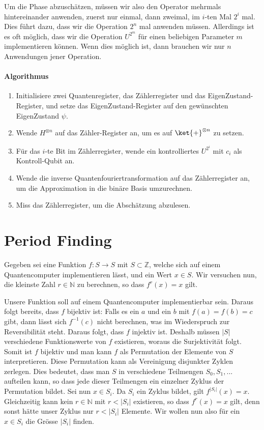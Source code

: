 Um die Phase abzuschätzen, müssen wir also den Operator mehrmals hintereinander anwenden, zuerst nur einmal, dann zweimal, im $i$-ten Mal $2^i$ mal. Dies führt dazu, dass wir die Operation $2^n$ mal anwenden müssen. Allerdings ist es oft möglich, dass wir die Operation $U^{2^m}$ für einen beliebigen Parameter $m$ implementieren können. Wenn dies möglich ist, dann brauchen wir nur $n$ Anwendungen jener Operation.

\paragraph{Algorithmus}
\begin{enumerate}
    \item Initialisiere zwei Quantenregister, das Zählerregister und das EigenZustand-Register, und setze das EigenZustand-Register auf den gewünschten EigenZustand $\psi$.
    \item Wende $H^{\otimes n}$ auf das Zähler-Register an, um es auf $\ket{+}^{\otimes n}$ zu setzen.
    \item Für das $i$-te Bit im Zählerregister, wende ein kontrolliertes $U^{2^i}$ mit $c_i$ als Kontroll-Qubit an.
    \item Wende die inverse Quantenfouriertransformation auf das Zählerregister an, um die Approximation in die binäre Basis umzurechnen.
    \item Miss das Zählerregister, um die Abschätzung abzulesen.
\end{enumerate}
 \newline

\section{Period Finding}
Gegeben sei eine Funktion $f : S \rightarrow S$ mit $S \subset \mathbb{Z}$, welche sich auf einem Quantencomputer implementieren lässt, und ein Wert $x \in S$. Wir versuchen nun, die kleinste Zahl $r \in \mathbb{N}$ zu berechnen, so dass $f^r(x) = x$ gilt.

Unsere Funktion soll auf einem Quantencomputer implementierbar sein. Daraus folgt bereits, dass $f$ bijektiv ist: Falls es ein $a$ und ein $b$ mit $f(a) = f(b) = c$ gibt, dann lässt sich $f^{-1}(c)$ nicht berechnen, was im Wiederspruch zur Reversibilität steht. Daraus folgt, dass $f$ injektiv ist. Deshalb müssen $|S|$ verschiedene Funktionswerte von $f$ existieren, woraus die Surjektivität folgt. Somit ist $f$ bijektiv und man kann $f$ als Permutation der Elemente von $S$ interpretieren. Diese Permutation kann als Vereinigung disjunkter Zyklen zerlegen.
Dies bedeutet, dass man $S$ in verschiedene Teilmengen $S_0, S_1, ...$ aufteilen kann, so dass jede dieser Teilmengen ein einzelner Zyklus der Permutation bildet.
Sei nun $x \in S_i$. Da $S_i$ ein Zyklus bildet, gilt $f^{|S_i|}(x) = x$. Gleichzeitig kann kein $r \in \mathbb{N}$ mit $r < |S_i|$ existieren, so dass $f^r(x) = x$ gilt, denn sonst hätte unser Zyklus nur $r < |S_i|$ Elemente. Wir wollen nun also für ein $x \in S_i$ die Grösse $|S_i|$ finden.

